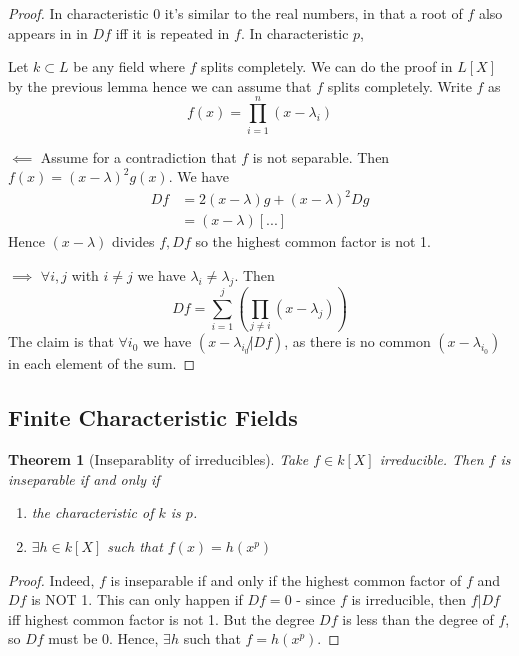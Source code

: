 \documentclass{article}
\theoremstyle{definition}
\theoremstyle{plain}%
\newtheorem{thm}{Theorem}[section]
\theoremstyle{remark}
\begin{document}
\begin{proof}
    In characteristic 0 it's similar to the real numbers, in that a root of $f$ also appears in in $Df$ iff it is repeated in $f$. In characteristic $p$,
    
    Let $k \subset L$ be any field where $f$ splits completely. We can do the proof in $L[X]$ by the previous lemma hence we can assume that $f$ splits completely. Write $f$ as
    \[f(x) = \prod_{i = 1}^n(x - \lambda_i)\]
    
    $\impliedby$
    Assume for a contradiction that $f$ is not separable. Then $f(x) = (x-\lambda)^2 g(x)$. We have
    \begin{align*}
        Df &= 2(x- \lambda)g + (x-\lambda)^2Dg \\
           &= (x- \lambda)[...]
    \end{align*}
    Hence $(x-\lambda)$ divides $f, Df$ so the highest common factor is not 1.
    
    $\implies$
    $\forall i,j$ with $i \ne j$ we have $\lambda_i \ne \lambda_j$. Then \[Df = \sum_{i=1}^j(\prod_{j \ne i} (x - \lambda_j))\]
    The claim is that $\forall i_0$ we have $(x-\lambda_{i_0} \not| Df)$, as there is no common $(x - \lambda_{i_0})$ in each element of the sum.
\end{proof}

\subsection{Finite Characteristic Fields}

\begin{thm}[Inseparablity of irreducibles]
    Take $f \in k[X]$ irreducible. Then $f$ is inseparable if and only if
    \begin{enumerate}
        \item the characteristic of $k$ is $p$.
        \item $\exists h \in k[X]$ such that $f(x) = h(x^p)$
    \end{enumerate}
\end{thm}

\begin{proof}
    Indeed, $f$ is inseparable if and only if the highest common factor of $f$ and $Df$ is NOT 1. This can only happen if $Df = 0$ - since $f$ is irreducible, then $f | Df$ iff highest common factor is not 1. But the degree $Df$ is less than the degree of $f$, so $Df$ must be 0. Hence, $\exists h$ such that $f = h(x^p)$.
\end{proof}
\end{document}
